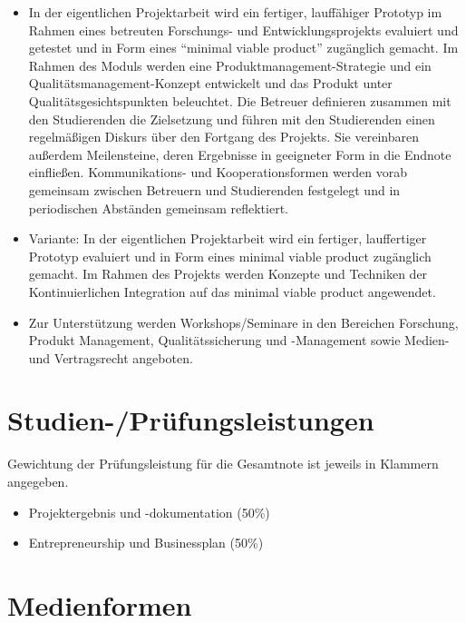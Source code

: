 \begin{itemize}
\tightlist
\item
  In der eigentlichen Projektarbeit wird ein fertiger, lauffähiger
  Prototyp im Rahmen eines betreuten Forschungs- und
  Entwicklungsprojekts evaluiert und getestet und in Form eines
  ``minimal viable product'' zugänglich gemacht. Im Rahmen des Moduls
  werden eine Produktmanagement-Strategie und ein
  Qualitätsmanagement-Konzept entwickelt und das Produkt unter
  Qualitätsgesichtspunkten beleuchtet. Die Betreuer definieren zusammen
  mit den Studierenden die Zielsetzung und führen mit den Studierenden
  einen regelmäßigen Diskurs über den Fortgang des Projekts. Sie
  vereinbaren außerdem Meilensteine, deren Ergebnisse in geeigneter Form
  in die Endnote einfließen. Kommunikations- und Kooperationsformen
  werden vorab gemeinsam zwischen Betreuern und Studierenden festgelegt
  und in periodischen Abständen gemeinsam reflektiert.
\item
  Variante: In der eigentlichen Projektarbeit wird ein fertiger,
  lauffertiger Prototyp evaluiert und in Form eines minimal viable
  product zugänglich gemacht. Im Rahmen des Projekts werden Konzepte und
  Techniken der Kontinuierlichen Integration auf das minimal viable
  product angewendet.
\item
  Zur Unterstützung werden Workshops/Seminare in den Bereichen
  Forschung, Produkt Management, Qualitätssicherung und -Management
  sowie Medien- und Vertragsrecht angeboten.
\end{itemize}

\section*{Studien-/Prüfungsleistungen\label{/mi-2017/modulbeschreibungen-master/MA_Modul_Projekt_Verwertung}}\label{studien-pruxfcfungsleistungenpathlabelmi-2017modulbeschreibungen-mastermaux5fmodulux5fprojektux5fverwertung}

Gewichtung der Prüfungsleistung für die Gesamtnote ist jeweils in
Klammern angegeben.

\begin{itemize}
\tightlist
\item
  Projektergebnis und -dokumentation (50\%)
\item
  Entrepreneurship und Businessplan (50\%)
\end{itemize}

\section*{Medienformen\label{/mi-2017/modulbeschreibungen-master/MA_Modul_Projekt_Verwertung}}\label{medienformenpathlabelmi-2017modulbeschreibungen-mastermaux5fmodulux5fprojektux5fverwertung}

